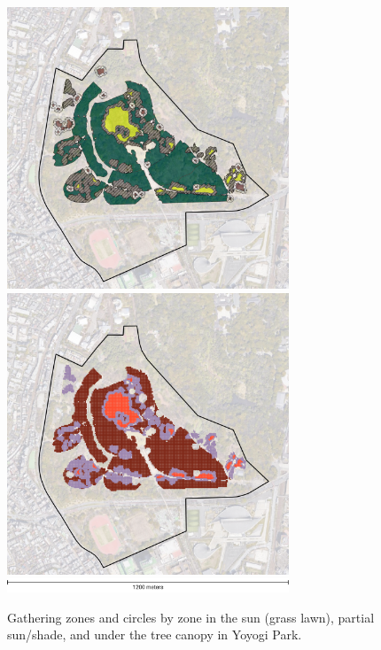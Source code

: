 \begin{figure}[H]
  \centering
  \captionsetup{width=0.75\textwidth}
  \includegraphics[width=0.75\textwidth]{images/gatherings/yoyogi_locations.png} \\
  \vspace{10pt} %
  \includegraphics[width=0.75\textwidth]{images/gatherings/yoyogi_circles.png} \\
  \vspace{10pt}
  \includegraphics[width=0.75\textwidth]{images/gatherings/scale_legend_3.png}
  \caption[Yoyogi Park - gathering zones and circles]{Gathering zones and circles by zone in the sun (grass lawn), partial sun/shade, and under the tree canopy in Yoyogi Park.}
  \label{fig:yoyogi_gathering}
\end{figure}

